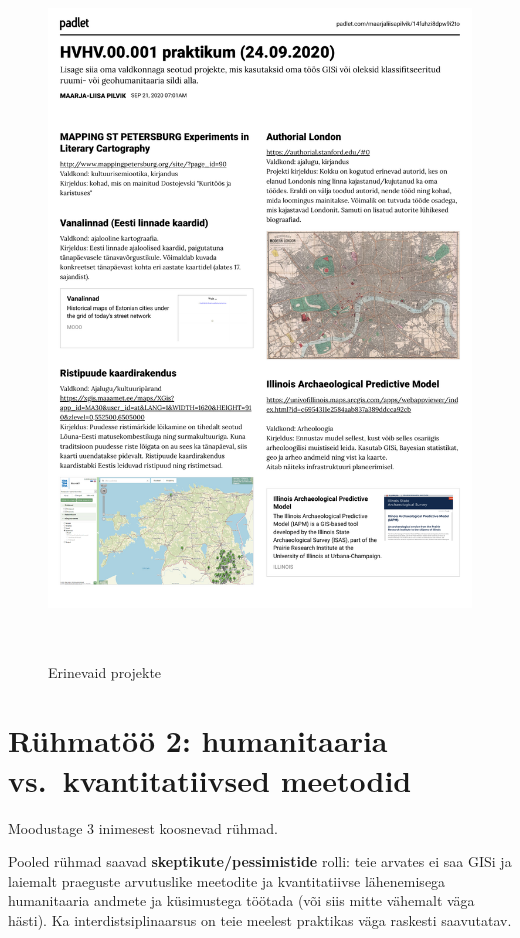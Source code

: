 \documentclass[
]{book}
\begin{document}
\begin{figure}
\centering
\includegraphics[width=1\textwidth,height=7.29167in]{./imgs/padlet_projektid.pdf}
\caption{Erinevaid projekte}
\end{figure}

\hypertarget{ruxfchmatuxf6uxf6-2-humanitaaria-vs.-kvantitatiivsed-meetodid}{%
\section{Rühmatöö 2: humanitaaria vs.~kvantitatiivsed meetodid}\label{ruxfchmatuxf6uxf6-2-humanitaaria-vs.-kvantitatiivsed-meetodid}}

Moodustage 3 inimesest koosnevad rühmad.

Pooled rühmad saavad \textbf{skeptikute/pessimistide} rolli: teie arvates ei saa GISi ja laiemalt praeguste arvutuslike meetodite ja kvantitatiivse lähenemisega humanitaaria andmete ja küsimustega töötada (või siis mitte vähemalt väga hästi). Ka interdistsiplinaarsus on teie meelest praktikas väga raskesti saavutatav.
\end{document}
